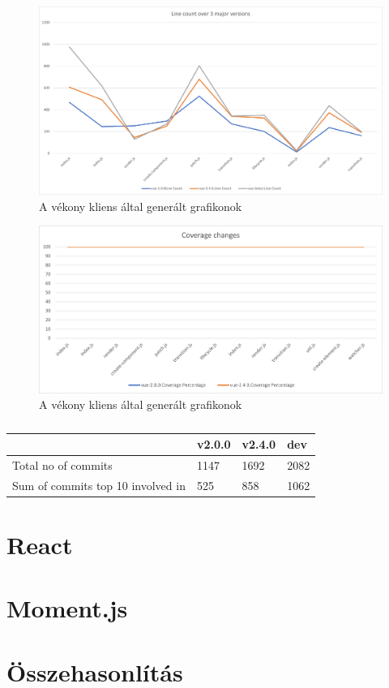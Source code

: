 \begin{figure}[H]
    \centering
    \includegraphics[width=1\textwidth]{images/vue/vue-all-line-count.png}
    \caption{A vékony kliens által generált grafikonok}
    \label{fig:hestia-charts}
\end{figure}

\begin{figure}[H]
    \centering
    \includegraphics[width=1\textwidth]{images/vue/vue-all-coverage.png}
    \caption{A vékony kliens által generált grafikonok}
    \label{fig:hestia-charts}
\end{figure}



\begin{table}[h]
    \centering
    \begin{tabular}{l|l|l|l}
                                          & v2.0.0 & v2.4.0 & dev  \\ \hline
        Total no of commits               & 1147   & 1692   & 2082 \\
        Sum of commits top 10 involved in & 525    & 858    & 1062
    \end{tabular}
    \caption{}\label{tab:my-table}
\end{table}

\section{React}

\section{Moment.js}

\section{Összehasonlítás}